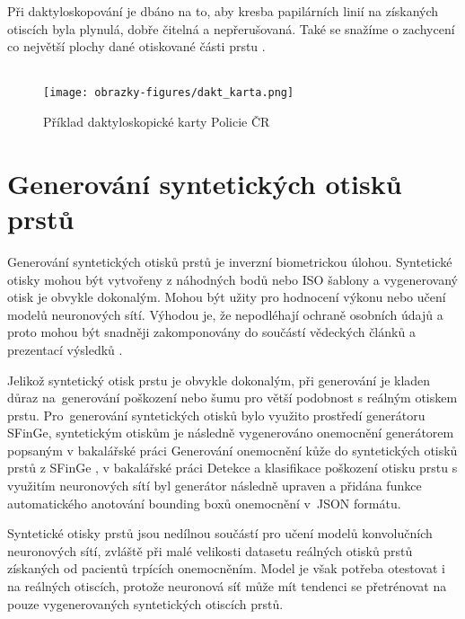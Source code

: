 Při daktyloskopování je dbáno na to, aby kresba papilárních linií na získaných otiscích byla plynulá, dobře čitelná a nepřerušovaná. Také se snažíme o zachycení co největší plochy dané otiskované části prstu \cite{BIOdaktylLecture}.\\\\

\begin{figure}[!htbp]
    \centering
    \texttt{[image: obrazky-figures/dakt\_karta.png]}
    \caption{Příklad daktyloskopické karty Policie ČR \cite{BIOdaktylLecture}}
\end{figure}

\section{Generování syntetických otisků prstů}
Generování syntetických otisků prstů je inverzní biometrickou úlohou. Syntetické otisky mohou být vytvořeny z náhodných bodů nebo ISO šablony a vygenerovaný otisk je obvykle dokonalým. Mohou být užity pro hodnocení výkonu nebo učení modelů neuronových sítí. Výhodou je, že nepodléhají ochraně osobních údajů a proto mohou být snadněji zakomponovány do součástí vědeckých článků a prezentací výsledků \cite{BIOotiskyLecture}.

Jelikož syntetický otisk prstu je obvykle dokonalým, při generování je kladen důraz na~generování poškození nebo šumu pro větší podobnost s reálným otiskem prstu. Pro~generování syntetických otisků bylo využito prostředí generátoru SFinGe, syntetickým otiskům je následně vygenerováno onemocnění generátorem popsaným v bakalářské práci Generování onemocnění kůže do syntetických otisků prstů z
SFinGe \cite{FITBT21893}, v bakalářské práci Detekce a klasifikace poškození otisku prstu s využitím neuronových sítí \cite{FITBT22567} byl generátor následně upraven a přidána funkce automatického anotování bounding boxů onemocnění v~JSON formátu.

Syntetické otisky prstů jsou nedílnou součástí pro učení modelů konvolučních neuronových sítí, zvláště při malé velikosti datasetu reálných otisků prstů získaných od pacientů trpících onemocněním. Model je však potřeba otestovat i na reálných otiscích, protože neuronová síť může mít tendenci se přetrénovat na pouze vygenerovaných syntetických otiscích prstů.

